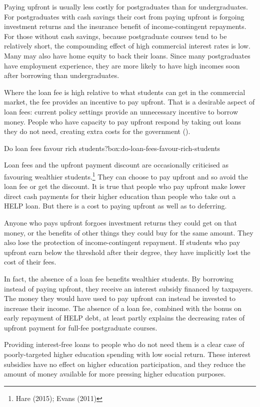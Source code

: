 \documentclass[embargoed]{grattan}
\begin{document}
Paying upfront is usually less costly for postgraduates than for undergraduates. For postgraduates with cash savings their cost from paying upfront is forgoing investment returns and the insurance benefit of income-contingent repayments. For those without cash savings, because postgraduate courses tend to be relatively short, the compounding effect of high commercial interest rates is low. Many may also have home equity to back their loans. Since many postgraduates have employment experience, they are more likely to have high incomes soon after borrowing than undergraduates.

Where the loan fee is high relative to what students can get in the commercial market, the fee provides an incentive to pay upfront. That is a desirable aspect of loan fees: current policy settings provide an unnecessary incentive to borrow money. People who have capacity to pay upfront respond by taking out loans they do not need, creating extra costs for the government ().

\begin{smallbox}{Do loan fees favour rich students?}{box:do-loan-fees-favour-rich-students}

Loan fees and the upfront payment discount are occasionally criticised as favouring wealthier students.\footnote{Hare (2015); Evans (2011)} They can choose to pay upfront and so avoid the loan fee or get the discount. It is true that people who pay upfront make lower direct cash payments for their higher education than people who take out a HELP loan. But there is a cost to paying upfront as well as to deferring.

Anyone who pays upfront forgoes investment returns they could get on that money, or the benefits of other things they could buy for the same amount. They also lose the protection of income-contingent repayment. If students who pay upfront earn below the threshold after their degree, they have implicitly lost the cost of their fees.

In fact, the absence of a loan fee benefits wealthier students. By borrowing instead of paying upfront, they receive an interest subsidy financed by taxpayers. The money they would have used to pay upfront can instead be invested to increase their income. The absence of a loan fee, combined with the bonus on early repayment of HELP debt, at least partly explains the decreasing rates of upfront payment for full-fee postgraduate courses.

Providing interest-free loans to people who do not need them is a clear case of poorly-targeted higher education spending with low social return. These interest subsidies have no effect on higher education participation, and they reduce the amount of money available for more pressing higher education purposes.
\end{smallbox}
\end{document}
